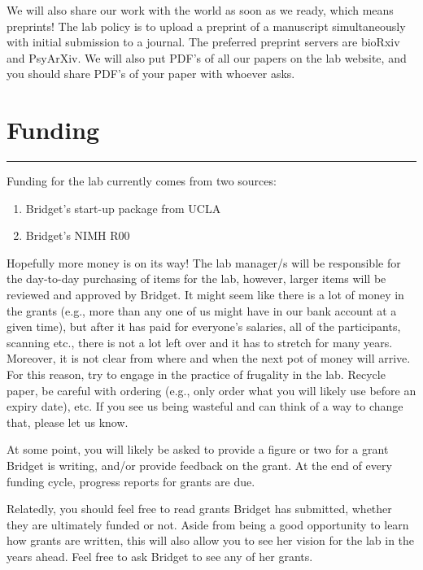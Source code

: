 \documentclass[]{book}
\providecommand{\tightlist}{%
  \setlength{\itemsep}{0pt}\setlength{\parskip}{0pt}}
\begin{document}
We will also share our work with the world as soon as we ready, which means preprints! The lab policy is to upload a preprint of a manuscript simultaneously with initial submission to a journal. The preferred preprint servers are bioRxiv and PsyArXiv. We will also put PDF's of all our papers on the lab website, and you should share PDF's of your paper with whoever asks.

\hypertarget{funding}{%
\chapter{Funding}\label{funding}}

\begin{center}\rule{0.5\linewidth}{0.5pt}\end{center}

Funding for the lab currently comes from two sources:

\begin{enumerate}
\def\labelenumi{\arabic{enumi}.}
\tightlist
\item
  Bridget's start-up package from UCLA
\item
  Bridget's NIMH R00
\end{enumerate}

Hopefully more money is on its way! The lab manager/s will be responsible for the day-to-day purchasing of items for the lab, however, larger items will be reviewed and approved by Bridget. It might seem like there is a lot of money in the grants (e.g., more than any one of us might have in our bank account at a given time), but after it has paid for everyone's salaries, all of the participants, scanning etc., there is not a lot left over and it has to stretch for many years. Moreover, it is not clear from where and when the next pot of money will arrive. For this reason, try to engage in the practice of frugality in the lab. Recycle paper, be careful with ordering (e.g., only order what you will likely use before an expiry date), etc. If you see us being wasteful and can think of a way to change that, please let us know.

At some point, you will likely be asked to provide a figure or two for a grant Bridget is writing, and/or provide feedback on the grant. At the end of every funding cycle, progress reports for grants are due.

Relatedly, you should feel free to read grants Bridget has submitted, whether they are ultimately funded or not. Aside from being a good opportunity to learn how grants are written, this will also allow you to see her vision for the lab in the years ahead. Feel free to ask Bridget to see any of her grants.
\end{document}
